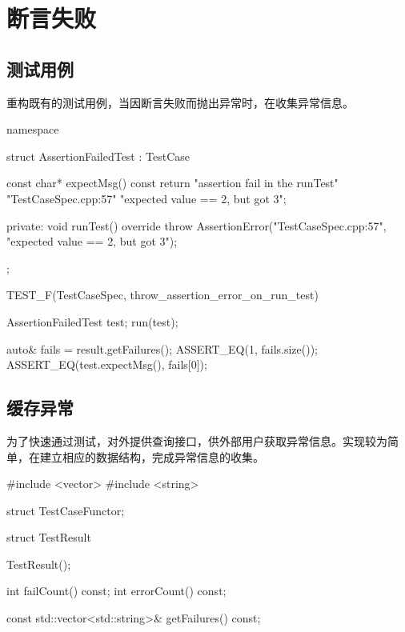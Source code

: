 \section{断言失败}

\begin{content}

\subsection{测试用例}

重构既有的测试用例，当因断言失败而抛出异常时，在收集异常信息。

\begin{leftbar}
 \begin{c++}[caption={\ttfamily{test/mars/core/TestCaseSpec.cc}}]
namespace {
  struct AssertionFailedTest : TestCase {
    const char* expectMsg() const {
      return "assertion fail in the runTest\n"
             "TestCaseSpec.cpp:57\n"
             "expected value == 2, but got 3";
    }

  private:
    void runTest() override {
      throw AssertionError("TestCaseSpec.cpp:57", "expected value == 2, but got 3");
    }
  };
}

TEST_F(TestCaseSpec, throw_assertion_error_on_run_test) {
  AssertionFailedTest test;
  run(test);

  auto& fails = result.getFailures(); 
  ASSERT_EQ(1, fails.size());
  ASSERT_EQ(test.expectMsg(), fails[0]);
}
 \end{c++}
\end{leftbar}

\subsection{缓存异常}

为了快速通过测试，对外提供查询接口，供外部用户获取异常信息。实现较为简单，在建立相应的数据结构，完成异常信息的收集。

\begin{leftbar}
 \begin{c++}[caption={\ttfamily{include/mars/core/TestResult.h}}]
#include <vector>
#include <string>

struct TestCaseFunctor;

struct TestResult {
  TestResult();

  int failCount() const;
  int errorCount() const;

  const std::vector<std::string>& getFailures() const;

}
\end{c++}
\end{leftbar}
\end{content}
